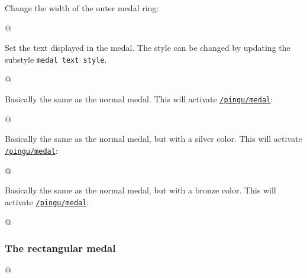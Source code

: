 \documentclass[parskip=half,english,numbers=noenddot,footnotes=nomultiple,oneside,fontsize=10pt,DIV=15,headinclude]{scrartcl}
\makeatletter
\def\pingu@listing@text{}
\def\lpingu#1{\begingroup\def\pingu@listing@text{#1}\lstinline[style=lstpingu,breakatwhitespace]'#1'\endgroup}
\newcommand*\keyref[2][/pingu/]{\hyperref[pk:#1#2]{\lpingu{#1#2}}}
\makeatother
\begin{document}
Change the width of the outer medal ring:
\begin{tcblisting}{@}
\begin{tikzpicture}
	\pingu[medal, medal shade=green,
	       medal shade width=2mm]
\end{tikzpicture}
\end{tcblisting}
\endsubkeyexplain

Set the text displayed in the medal. The style can be changed by
updating the substyle \texttt{medal text style}.
\begin{tcblisting}{@}
\begin{tikzpicture}
	\pingu[medal, medal text=XY,
	      medal text style/.style={black}]
\end{tikzpicture}
\end{tcblisting}
\endsubkeyexplain

Basically the same as the normal medal. This will activate \keyref{medal}:
\begin{tcblisting}{@}
\end{tcblisting}
\endkeyexplain

Basically the same as the normal medal, but with a silver color. This will activate \keyref{medal}:
\begin{tcblisting}{@}
\end{tcblisting}
\endkeyexplain

Basically the same as the normal medal, but with a bronze color. This will activate \keyref{medal}:
\begin{tcblisting}{@}
\end{tcblisting}
\endkeyexplain

\subsubsection{The rectangular medal}
\begin{tcblisting}{@}
\begin{tikzpicture}
	\pingu[rectmedal]
\end{tikzpicture}
\end{tcblisting}
\endshowkeyexplain
\end{document}
